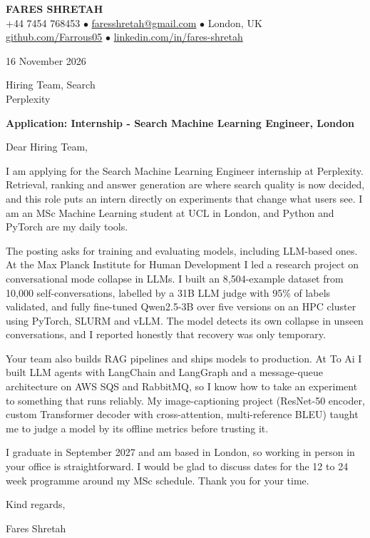 \documentclass[11pt, a4paper]{article}
\begin{document}
\begin{center}
    {\huge \textbf{FARES SHRETAH}} \\[3pt]
    \small +44 7454 768453 $\bullet$ \href{mailto:faresshretah@gmail.com}{faresshretah@gmail.com} $\bullet$ London, UK \\
    \small \href{https://github.com/Farrous05}{github.com/Farrous05} $\bullet$ \href{https://www.linkedin.com/in/fares-shretah/}{linkedin.com/in/fares-shretah}
\end{center}

\vspace{6pt}
16 November 2026

Hiring Team, Search \\
Perplexity

\textbf{Application: Internship - Search Machine Learning Engineer, London}

Dear Hiring Team,

I am applying for the Search Machine Learning Engineer internship at Perplexity. Retrieval, ranking and answer generation are where search quality is now decided, and this role puts an intern directly on experiments that change what users see. I am an MSc Machine Learning student at UCL in London, and Python and PyTorch are my daily tools.

The posting asks for training and evaluating models, including LLM-based ones. At the Max Planck Institute for Human Development I led a research project on conversational mode collapse in LLMs. I built an 8,504-example dataset from 10,000 self-conversations, labelled by a 31B LLM judge with 95\% of labels validated, and fully fine-tuned Qwen2.5-3B over five versions on an HPC cluster using PyTorch, SLURM and vLLM. The model detects its own collapse in unseen conversations, and I reported honestly that recovery was only temporary.

Your team also builds RAG pipelines and ships models to production. At To Ai I built LLM agents with LangChain and LangGraph and a message-queue architecture on AWS SQS and RabbitMQ, so I know how to take an experiment to something that runs reliably. My image-captioning project (ResNet-50 encoder, custom Transformer decoder with cross-attention, multi-reference BLEU) taught me to judge a model by its offline metrics before trusting it.

I graduate in September 2027 and am based in London, so working in person in your office is straightforward. I would be glad to discuss dates for the 12 to 24 week programme around my MSc schedule. Thank you for your time.

Kind regards,

Fares Shretah
\end{document}
